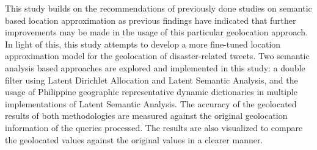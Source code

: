 \begin{thesisabstract}
This study builds on the recommendations of previously done studies on semantic based location approximation as previous findings have indicated that further improvements may be made in the usage of this particular geolocation approach. In light of this, this study attempts to develop a more fine-tuned location approximation model for the geolocation of disaster-related tweets. Two semantic analysis based approaches are explored and implemented in this study: a double filter using Latent Dirichlet Allocation and Latent Semantic Analysis, and the usage of Philippine geographic representative dynamic dictionaries in multiple implementations of Latent Semantic Analysis. The accuracy of the geolocated results of both methodologies are measured against the original geolocation information of the queries processed. The results are also visualized to compare the geolocated values against the original values in a clearer manner.
\end{thesisabstract}